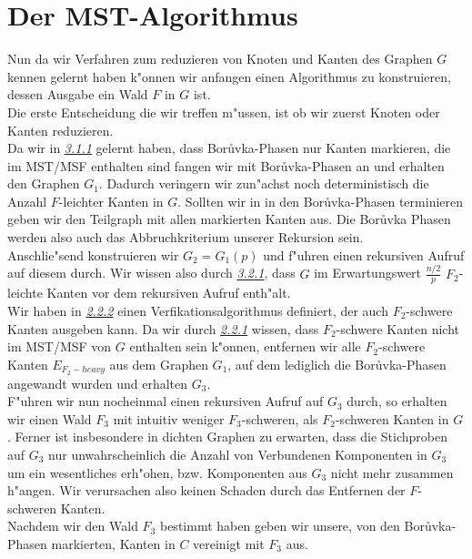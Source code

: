 \section{Der MST-Algorithmus}

Nun da wir Verfahren zum reduzieren von Knoten und Kanten des Graphen $G$ kennen
    gelernt haben  k"onnen wir anfangen einen Algorithmus zu konstruieren,
    dessen Ausgabe ein Wald $F$ in $G$ ist.\\
Die erste Entscheidung die wir treffen m"ussen, ist ob wir zuerst Knoten oder Kanten
    reduzieren. \\
Da wir in \hyperref[sec:borIdea]{\textit{3.1.1}} gelernt haben, dass
    Bor\r uvka-Phasen nur Kanten markieren, die im MST/MSF 
    enthalten sind fangen wir mit Bor\r uvka-Phasen an und erhalten den Graphen 
    $G_1$.
    Dadurch veringern wir
    zun"achst noch deterministisch die Anzahl $F$-leichter Kanten in $G$.
    Sollten wir in in den Bor\r uvka-Phasen terminieren geben wir den Teilgraph
    mit allen markierten Kanten aus.
    Die Bor\r uvka Phasen werden also auch das Abbruchkriterium unserer
    Rekursion sein.\\
Anschlie"send konstruieren wir $G_2 = G_1(p)$ und f"uhren einen rekursiven
    Aufruf auf diesem durch. 
    Wir wissen also durch \hyperref[sec:goodnessRand]{\textit{3.2.1}}, 
    dass $G$ im Erwartungswert
    $\frac{n/2}{p}$ $F_2$-leichte Kanten vor dem rekursiven Aufruf enth"alt.\\
Wir haben in \hyperref[sec:verification]{\textit{2.2.2}} einen 
    Verfikationsalgorithmus definiert, der auch $F_2$-schwere Kanten ausgeben
    kann.
    Da wir durch \hyperref[sec:fProof]{\textit{2.2.1}} wissen, dass $F_2$-schwere Kanten nicht im MST/MSF von $G$
    enthalten sein k"onnen, entfernen wir alle $F_2$-schwere Kanten $E_{F_2-heavy}$
    aus dem Graphen $G_1$,
    auf dem lediglich die Bor\r uvka-Phasen angewandt wurden und erhalten $G_3$.\\
F"uhren wir nun nocheinmal einen rekursiven Aufruf auf $G_3$ durch, 
    so erhalten wir 
    einen Wald $F_3$ mit intuitiv weniger $F_3$-schweren, als $F_2$-schweren Kanten in $G$.
    Ferner ist insbesondere in dichten Graphen zu erwarten, dass die Stichproben 
    auf $G_3$ nur unwahrscheinlich die Anzahl von Verbundenen Komponenten in 
    $G_3$ um ein wesentliches erh"ohen, bzw. Komponenten aus $G_3$ nicht mehr
    zusammen h"angen.
    Wir verursachen also keinen Schaden durch das Entfernen der $F$-schweren
    Kanten.\\
Nachdem wir den Wald $F_3$ bestimmt haben geben wir unsere, von den Bor\r uvka-Phasen
    markierten, Kanten in $C$ vereinigt mit $F_3$ aus.\\

